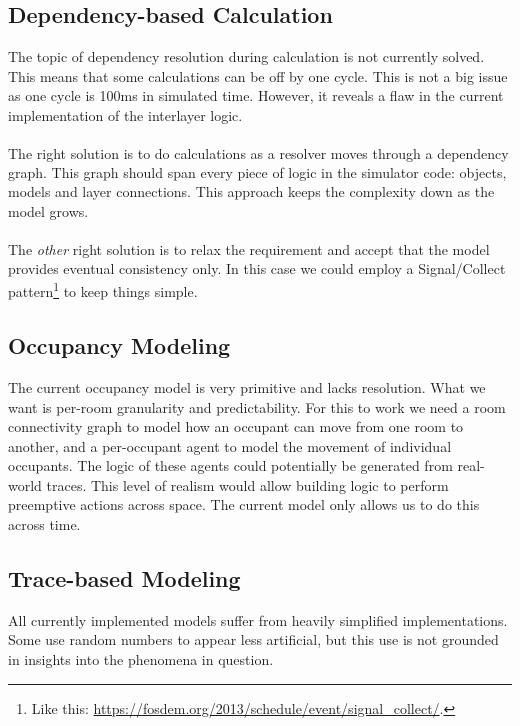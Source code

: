 \documentclass[10pt]{article}
\begin{document}
\subsection{Dependency-based Calculation}

The topic of dependency resolution during calculation is not currently solved. This means that some calculations can be off by one cycle. This is not a big issue as one cycle is 100ms in simulated time. However, it reveals a flaw in the current implementation of the interlayer logic.

The right solution\textsuperscript{\textregistered} is to do calculations as a resolver moves through a dependency graph. This graph should span every piece of logic in the simulator code: objects, models and layer connections. This approach keeps the complexity down as the model grows.

The \textsl{other} right solution\textsuperscript{\textregistered} is to relax the requirement and accept that the model provides eventual consistency only. In this case we could employ a Signal/Collect pattern\footnote{Like this: \url{https://fosdem.org/2013/schedule/event/signal_collect/}.} to keep things simple.

\subsection{Occupancy Modeling}
\label{lessons:occupancy}

The current occupancy model is very primitive and lacks resolution. What we want is per-room granularity and predictability. For this to work we need a room connectivity graph to model how an occupant can move from one room to another, and a per-occupant agent to model the movement of individual occupants. The logic of these agents could potentially be generated from real-world traces. This level of realism would allow building logic to perform preemptive actions across space. The current model only allows us to do this across time.

\subsection{Trace-based Modeling}

All currently implemented models suffer from heavily simplified implementations. Some use random numbers to appear less artificial, but this use is not grounded in insights into the phenomena in question.
\end{document}
